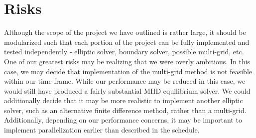 \documentclass[paper=letter, fontsize=11pt]{scrartcl} %
\begin{document}

\section{Risks}

Although the scope of the project we have outlined is rather large, it should be modularized such that each portion of the project can be fully implemented and tested independently - elliptic solver, boundary solver, possible multi-grid, etc. One of our greatest risks may be realizing that we were overly ambitious. In this case, we may decide that implementation of the multi-grid method is not feasible within our time frame. While our performance may be reduced in this case, we would still have produced a fairly substantial MHD equilibrium solver. We could additionally decide that it may be more realistic to implement another elliptic solver, such as an alternative finite difference method, rather than a multi-grid. Additionally, depending on our performance concerns, it may be important to implement parallelization earlier than described in the schedule. 
\end{document}
